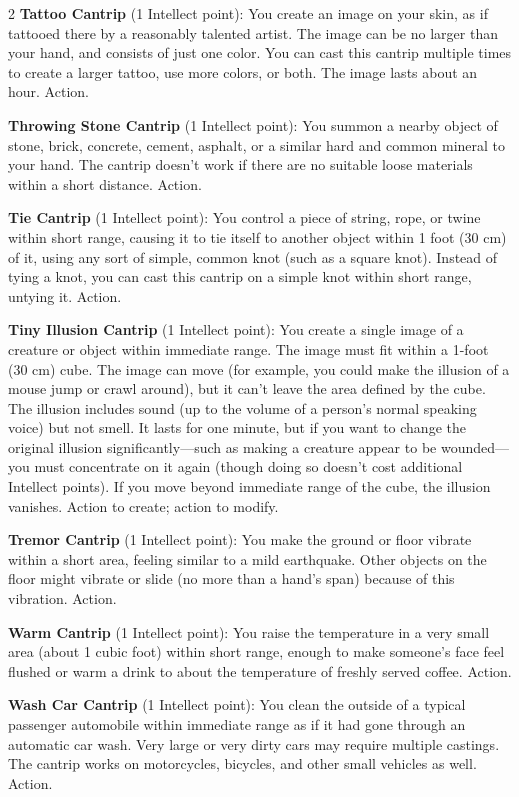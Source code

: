 \begin{multicols}{2}
\textbf{Tattoo Cantrip} (1 Intellect point): You create an image on your skin, as if tattooed there by a reasonably talented artist. The image can be no larger than your hand, and consists of just one color. You can cast this cantrip multiple times to create a larger tattoo, use more colors, or both. The image lasts about an hour. Action. 

\textbf{Throwing Stone Cantrip} (1 Intellect point): You summon a nearby object of stone, brick, concrete, cement, asphalt, or a similar hard and common mineral to your hand. The cantrip doesn’t work if there are no suitable loose materials within a short distance. Action. 

\textbf{Tie Cantrip} (1 Intellect point): You control a piece of string, rope, or twine within short range, causing it to tie itself to another object within 1 foot (30 cm) of it, using any sort of simple, common knot (such as a square knot). Instead of tying a knot, you can cast this cantrip on a simple knot within short range, untying it. Action. 

\textbf{Tiny Illusion Cantrip} (1 Intellect point): You create a single image of a creature or object within immediate range. The image must fit within a 1-foot (30 cm) cube. The image can move (for example, you could make the illusion of a mouse jump or crawl around), but it can’t leave the area defined by the cube. The illusion includes sound (up to the volume of a person’s normal speaking voice) but not smell. It lasts for one minute, but if you want to change the original illusion significantly—such as making a creature appear to be wounded— you must concentrate on it again (though doing so doesn’t cost additional Intellect points). If you move beyond immediate range of the cube, the illusion vanishes. Action to create; action to modify. 

\textbf{Tremor Cantrip} (1 Intellect point): You make the ground or floor vibrate within a short area, feeling similar to a mild earthquake. Other objects on the floor might vibrate or slide (no more than a hand’s span) because of this vibration. Action. 

\textbf{Warm Cantrip} (1 Intellect point): You raise the temperature in a very small area (about 1 cubic foot) within short range, enough to make someone’s face feel flushed or warm a drink to about the temperature of freshly served coffee. Action. 

\textbf{Wash Car Cantrip} (1 Intellect point): You clean the outside of a typical passenger automobile within immediate range as if it had gone through an automatic car wash. Very large or very dirty cars may require multiple castings. The cantrip works on motorcycles, bicycles, and other small vehicles as well. Action. 


\end{multicols}
